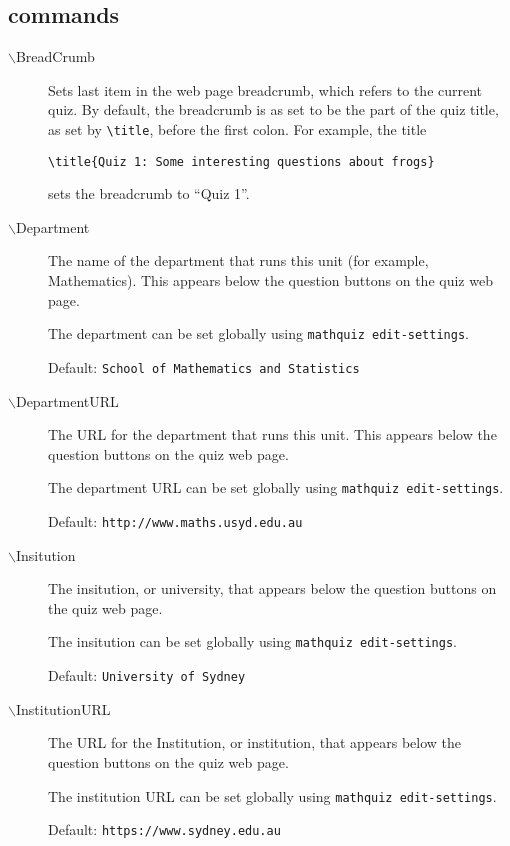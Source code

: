 \documentclass[svgnames]{article}
\newcommand\mathquizopt[1]{\texttt{mathquiz \textemdash\textemdash#1}}
\begin{document}
\subsection{\MathQuiz commands}
\begin{description}
  \item[$\backslash$BreadCrumb]
     Sets last item in the web page breadcrumb, which refers to the
     current quiz. By default, the breadcrumb is as set to be the
     part of the quiz title, as set by \verb!\title!,
     before the first colon. For example, the title

     \hspace*{20mm}\verb!\title{Quiz 1: Some interesting questions about frogs}!

     sets the breadcrumb to ``Quiz 1''.

  \item[$\backslash$Department]
    The name of the department that runs this unit (for example,
    Mathematics). This appears below the question buttons on the quiz web
    page.

    The department can be set globally using \texttt{mathquiz \textemdash\textemdash edit-settings}.

    Default: \texttt{School of Mathematics and Statistics}

  \item[$\backslash$DepartmentURL]
    The URL for the department that runs this unit. This appears below
    the question buttons on the quiz web page.

    The department URL can be set globally using \mathquizopt{edit-settings}.

    Default: \texttt{http://www.maths.usyd.edu.au}

  \item[$\backslash$Insitution]
    The insitution, or university, that appears below the question
    buttons on the quiz web page.

    The insitution can be set globally using \mathquizopt{edit-settings}.

    Default: \texttt{University of Sydney}

  \item[$\backslash$InstitutionURL]
    The URL for the Institution, or institution, that appears below the
    question buttons on the quiz web page.

    The institution URL can be set globally using \mathquizopt{edit-settings}.

    Default: \texttt{https://www.sydney.edu.au}


\end{description}
\end{document}
